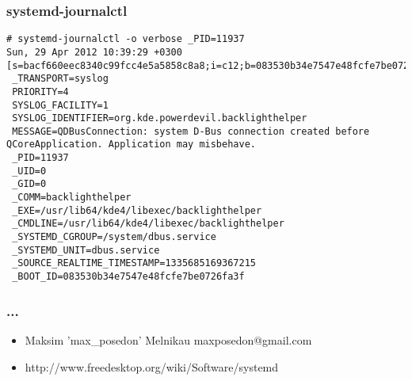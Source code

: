 \documentclass{beamer}
\begin{document}
\begin{frame}[fragile]
    \frametitle{systemd-journalctl}
    \begin{verbatim}
# systemd-journalctl -o verbose _PID=11937        
Sun, 29 Apr 2012 10:39:29 +0300 [s=bacf660eec8340c99fcc4e5a5858c8a8;i=c12;b=083530b34e7547e48fcfe7be0726fa3f;m=391c22b0a;t=4becc700d4ce7;x=91977399849a3d57;p=system.journal]
 _TRANSPORT=syslog
 PRIORITY=4
 SYSLOG_FACILITY=1
 SYSLOG_IDENTIFIER=org.kde.powerdevil.backlighthelper
 MESSAGE=QDBusConnection: system D-Bus connection created before QCoreApplication. Application may misbehave.
 _PID=11937
 _UID=0
 _GID=0
 _COMM=backlighthelper
 _EXE=/usr/lib64/kde4/libexec/backlighthelper
 _CMDLINE=/usr/lib64/kde4/libexec/backlighthelper
 _SYSTEMD_CGROUP=/system/dbus.service
 _SYSTEMD_UNIT=dbus.service
 _SOURCE_REALTIME_TIMESTAMP=1335685169367215
 _BOOT_ID=083530b34e7547e48fcfe7be0726fa3f
    \end{verbatim}
\end{frame}

\begin{frame}[fragile]
    \frametitle{...}
    \begin{itemize}
    \item Maksim 'max\_posedon' Melnikau maxposedon@gmail.com
    \item http://www.freedesktop.org/wiki/Software/systemd
    \end{itemize}
\end{frame}
\end{document}
